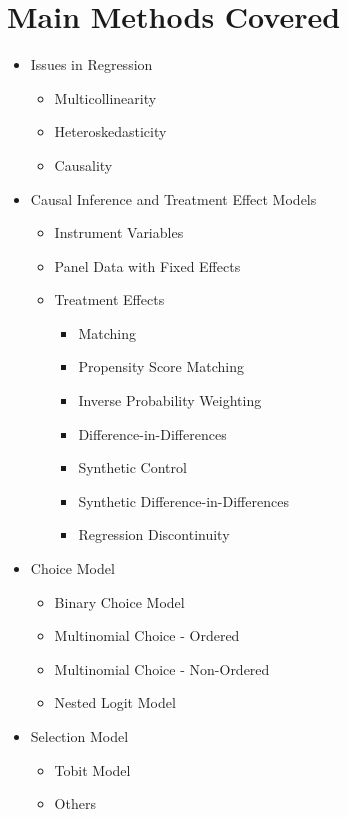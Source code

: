 \documentclass[a4paper]{article}
\begin{document}
\section{Main Methods Covered}
\begin{itemize}
    
    \item Issues in Regression
    \begin{itemize}
        \item Multicollinearity
        \item Heteroskedasticity
        \item Causality
    \end{itemize}
    
    \item Causal Inference and Treatment Effect Models
    \begin{itemize}
        \item Instrument Variables
        \item Panel Data with Fixed Effects
        \item Treatment Effects
        \begin{itemize}
            \item Matching
            \item Propensity Score Matching
            \item Inverse Probability Weighting
            \item Difference-in-Differences
            \item Synthetic Control
            \item Synthetic Difference-in-Differences
            \item Regression Discontinuity
        \end{itemize}
    \end{itemize}

    \item Choice Model
    \begin{itemize}
        \item Binary Choice Model
        \item Multinomial Choice - Ordered
        \item Multinomial Choice - Non-Ordered
        \item Nested Logit Model
    \end{itemize}

    \item Selection Model
    \begin{itemize}
        \item Tobit Model
        \item Others
    \end{itemize}

\end{itemize}
\end{document}

